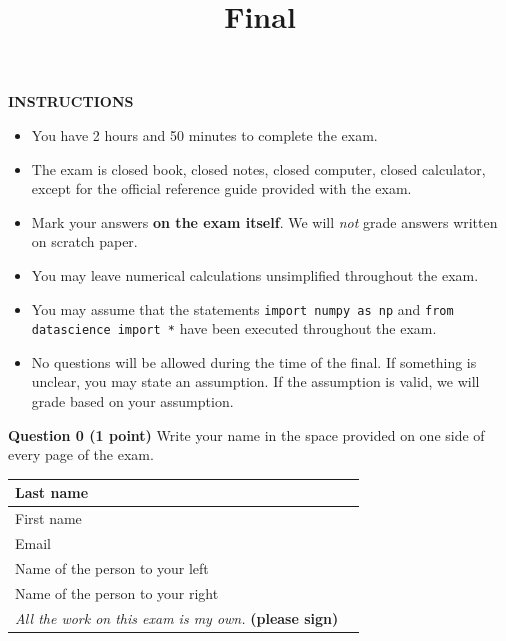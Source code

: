 \documentclass[twoside]{article}
\title{\sc Final \solution{Solutions}}
\begin{document}
\thispagestyle{empty}
\maketitle

\medskip

\textbf{INSTRUCTIONS}

\begin{itemize}
\item You have 2 hours and 50 minutes to complete the exam.

\item The exam is closed book, closed notes, closed computer, closed calculator,
except for the official reference guide provided with the exam.

\item Mark your answers \textbf{on the exam itself}. We will \emph{not} grade
answers written on scratch paper.

\item You may leave numerical calculations unsimplified throughout the exam.

\item You may assume that the statements {\tt import numpy as np} and {\tt from datascience import *} have been executed throughout the exam.

\item No questions will be allowed during the time of the final. If something is unclear, you may state an assumption. If the assumption is valid, we will grade based on your assumption. 
\end{itemize}
\textbf{Question 0 (1 point)} Write your name in the space provided on one side of every page of the exam. 
\medskip

\begin{center}
\begin{tabular}{|m{6cm}|m{8cm}|}
\hline
Last name & \\ [1cm]
\hline
First name & \\ [1cm]
\hline
Email & \\ [1cm]
\hline
Name of the person to your left & \\ [1cm]
\hline
Name of the person to your right & \\ [1cm]
\hline
\emph{All the work on this exam is my own.} \textbf{(please sign)} & \\ [1cm]
\hline
\end{tabular}
\end{center}
\vfill
\vfill
\newpage

\begin{enumerate}
    
    
    
    
    \newpage
    
    \newpage
    
    
    
    \newpage
    
    
    
    \newpage
    


\end{enumerate}
\end{document}
